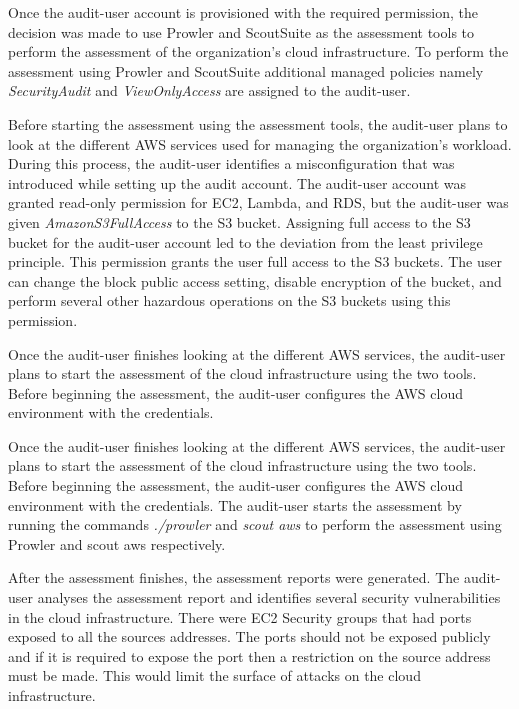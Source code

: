 \par Once the audit-user account is provisioned with the required permission, the decision was made to use Prowler and ScoutSuite as the assessment tools to perform the assessment of the organization’s cloud infrastructure.
To perform the assessment using Prowler and ScoutSuite additional managed policies namely \textit{SecurityAudit} and \textit{ViewOnlyAccess} are assigned to the audit-user.

\par Before starting the assessment using the assessment tools, the audit-user plans to look at the different AWS services used for managing the organization’s workload.
During this process, the audit-user identifies a misconfiguration that was introduced while setting up the audit account.
The audit-user account was granted read-only permission
for EC2, Lambda, and RDS, but the audit-user was given \textit{AmazonS3FullAccess} to the S3 bucket.
Assigning full access to the S3 bucket for the audit-user account led to the deviation from the least privilege principle.
This permission grants the user full access to the S3 buckets.
The user can change the block public access setting, disable encryption of the bucket, and perform several other hazardous operations on the S3 buckets using this permission.

\par Once the audit-user finishes looking at the different AWS services, the audit-user plans to start the assessment of the cloud infrastructure using the two tools.
Before beginning the assessment, the audit-user configures the AWS cloud environment with the credentials.

\par Once the audit-user finishes looking at the different AWS services, the audit-user plans to start the assessment of the cloud infrastructure using the two tools.
Before beginning the assessment, the audit-user configures the AWS cloud environment with the credentials.
The audit-user starts the assessment by running the commands \textit{./prowler} and \textit{scout aws} to perform the assessment using Prowler and scout aws respectively.

\par After the assessment finishes, the assessment reports were generated.
The audit-user analyses the assessment report and identifies several security vulnerabilities in the cloud infrastructure.
There were EC2 Security groups that had ports exposed to all the sources addresses.
The ports should not be exposed publicly and if it is required to expose the port then a restriction on the source address must be made.
This would limit the surface of attacks on the cloud infrastructure.


